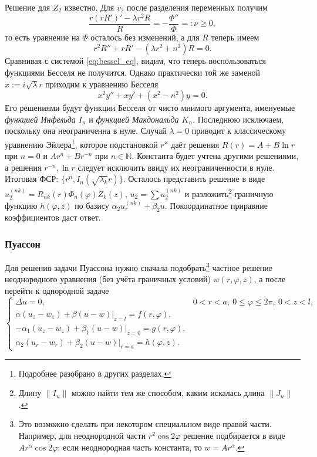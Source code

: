 
Решение для $ Z_2 $ известно. Для $ v_2 $ после разделения переменных получим 
\[
    \frac{r(rR')' - \lambda r^2 R}{R} = -\frac{\Phi''}{\Phi} =: \nu \geqslant 0,
  \]
то есть уравнение на $ \Phi $ осталось без изменений, а для $ R $ теперь
имеем
\[
    r^2R'' + rR' - (\lambda r^2 + n^2)R = 0.
\]
Сравнивая с системой \eqref{eq:bessel_eq}, видим, что теперь воспользоваться
функциями Бесселя не получится. Однако практически той же заменой $ x :=
i\sqrt\lambda r $ приходим к уравнению Бесселя 
\[
    x^2 y'' + x y' + (x^2 - n^2)y = 0.
\]
Его решениями будут функции Бесселя от чисто мнимого аргумента, именуемые
\emph{функцией Инфельда $ I_n $} и \emph{функцией Макдональда $ K_n $}.
Последнюю исключаем, поскольку она неограниченна в нуле. Случай $ \lambda = 0 $
приводит к классическому уравнению Эйлера\footnote{Подробнее разобрано в других
разделах.}, которое подстановкой $ r^\varkappa $ даёт решения $ R(r) = A + B\ln
r$ при $ n = 0 $ и $ Ar^{n} + Br^{-n} $ при $ n \in \mathbb N $. Константа будет
учтена другими решениями, а решения $ r^{-n}, \ln r $ следует исключить ввиду их
неограниченности в нуле. Итоговая ФСР: $ \{r^n, I_n(\sqrt{\lambda_k} r)\} $.
Осталось представить решение в виде $ u_2^{(nk)} = R_{nk}(r) \Phi_n(\varphi) Z_k(z)
$, $ u_2 = \sum u_2^{(nk)} $ и разложить\footnote{Длину $ \|I_n\| $ можно найти тем же способом, каким
искалась длина $ \|J_n\| $.}  граничную функцию $ h(\varphi, z)
$ по базису $ \alpha_2u_r^{(nk)} + \beta_2 u $. Покоординатное приравние
коэффициентов даст ответ.
\subsubsection{Пуассон}
Для решения задачи Пуассона нужно сначала подобрать\footnote{Это возможно
  сделать при некотором специальном виде правой части. Например, для неоднородной части $ r^2\cos 2\varphi $ решение подбирается в виде
$ Ar^\alpha\cos2\varphi $; если неоднородная часть константа, то $ w = Ar^\alpha
$.} частное решение
неоднородного уравнения
(без учёта граничных условий) $ w(r,\varphi, z) $, а после перейти к однородной
задаче
\[
  \begin{cases}
    \Delta u = 0, & 0 < r < a, \ 0\leqslant \varphi \leqslant 2\pi,
    \ 0 < z < l,\\
    \alpha (u_z - w_z) + \beta (u-w) \Big|_{z=l} = f(r, \varphi),\\
      -\alpha_1 (u_z - w_z) + \beta_1 (u - w)\Big|_{z=0} = g(r, \varphi),\\
      \alpha_2 (u_r - w_r) + \beta_2 (u-w) \Big|_{r=a} = h(\varphi, z).
  \end{cases}
\]
